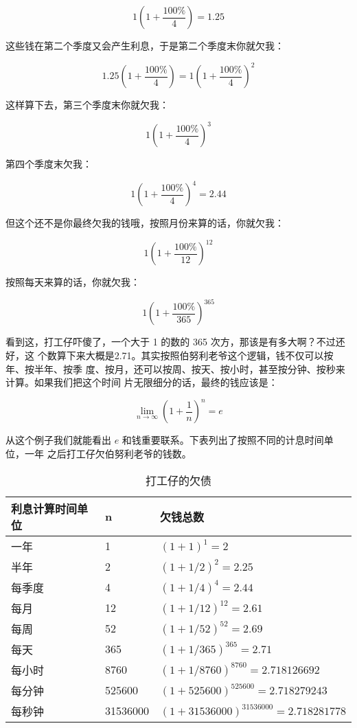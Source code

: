$$ 1(1+ \frac {100\%} {4}) = 1.25 $$

这些钱在第二个季度又会产生利息，于是第二个季度末你就欠我：

$$ 1.25(1+ \frac {100\%} {4}) = 1(1+ \frac {100\%} {4})^2 $$

这样算下去，第三个季度末你就欠我：

$$ 1(1+ \frac {100\%} {4})^3 $$

第四个季度末欠我：

$$ 1(1+ \frac {100\%} {4})^4 = 2.44 $$

但这个还不是你最终欠我的钱哦，按照月份来算的话，你就欠我：

$$ 1(1+ \frac {100\%} {12})^{12} $$

按照每天来算的话，你就欠我：

$$ 1(1+ \frac {100\%} {365})^{365} $$

看到这，打工仔吓傻了，一个大于 1 的数的 365 次方，那该是有多大啊？不过还好，这
个数算下来大概是2.71。其实按照伯努利老爷这个逻辑，钱不仅可以按年、按半年、按季
度、按月，还可以按周、按天、按小时，甚至按分钟、按秒来计算。如果我们把这个时间
片无限细分的话，最终的钱应该是：

$$ \lim_{n \to \infty}(1+\frac{1}{n})^n = e $$

从这个例子我们就能看出 $e$ 和钱重要联系。下表列出了按照不同的计息时间单位，一年
之后打工仔欠伯努利老爷的钱数。

\begin{table}[htbp]
\centering
\caption{打工仔的欠债}
\begin{tabular}{|l|l|l|}
\hline
利息计算时间单位 & n        & 欠钱总数                         \\ \hline
一年       & 1        & $ (1+1)^1=2 $                          \\ \hline
半年       & 2        & $ (1+1/2)^2=2.25 $                     \\ \hline
每季度      & 4        & $ (1+1/4)^4=2.44 $                    \\ \hline
每月       & 12       & $ (1+1/12)^{12} = 2.61 $               \\ \hline
每周       & 52       & $ (1+1/52)^{52}=2.69 $                 \\ \hline
每天       & 365      & $ (1+1/365)^{365}=2.71 $               \\ \hline
每小时      & 8760     & $ (1+1/8760)^{8760}=2.718126692 $     \\ \hline
每分钟      & 525600   & $ (1+525600)^{525600}=2.718279243 $   \\ \hline
每秒钟      & 31536000 & $ (1+31536000)^{31536000}=2.718281778 $ \\ \hline
\end{tabular}
\end{table}

